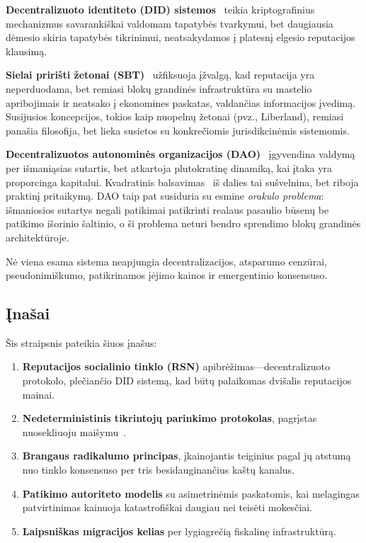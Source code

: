\documentclass[11pt,a4paper,twocolumn]{article}
\begin{document}
\textbf{Decentralizuoto identiteto (DID) sistemos}~\cite{did2022} teikia kriptografinius mechanizmus savarankiškai valdomam tapatybės tvarkymui, bet daugiausia dėmesio skiria tapatybės tikrinimui, neatsakydamos į platesnį elgesio reputacijos klausimą.

\textbf{Sielai pririšti žetonai (SBT)}~\cite{weyl2022} užfiksuoja įžvalgą, kad reputacija yra neperduodama, bet remiasi blokų grandinės infrastruktūra su mastelio apribojimais ir neatsako į ekonomines paskatas, valdančias informacijos įvedimą. Susijusios koncepcijos, tokios kaip nuopelnų žetonai (pvz., Liberland), remiasi panašia filosofija, bet lieka susietos su konkrečiomis jurisdikcinėmis sistemomis.

\textbf{Decentralizuotos autonominės organizacijos (DAO)}~\cite{buterin2014} įgyvendina valdymą per išmaniąsias sutartis, bet atkartoja plutokratinę dinamiką, kai įtaka yra proporcinga kapitalui. Kvadratinis balsavimas~\cite{buterin2019} iš dalies tai sušvelnina, bet riboja praktinį pritaikymą. DAO taip pat susiduria su esmine \emph{orakulo problema}: išmaniosios sutartys negali patikimai patikrinti realaus pasaulio būsenų be patikimo išorinio šaltinio, o ši problema neturi bendro sprendimo blokų grandinės architektūroje.

Nė viena esama sistema neapjungia decentralizacijos, atsparumo cenzūrai, pseudonimiškumo, patikrinamos įėjimo kainos ir emergentinio konsensuso.

\subsection{Įnašai}

Šis straipsnis pateikia šiuos įnašus:
\begin{enumerate}[nosep]
\item \textbf{Reputacijos socialinio tinklo (RSN)} apibrėžimas---decentralizuoto protokolo, plečiančio DID sistemą, kad būtų palaikomas dvišalis reputacijos mainai.
\item \textbf{Nedeterministinis tikrintojų parinkimo protokolas}, pagrįstas nuosekliuoju maišymu~\cite{karger1997}.
\item \textbf{Brangaus radikalumo principas}, įkainojantis teiginius pagal jų atstumą nuo tinklo konsensuso per tris besidauginančius kaštų kanalus.
\item \textbf{Patikimo autoriteto modelis} su asimetrinėmis paskatomis, kai melagingas patvirtinimas kainuoja katastrofiškai daugiau nei teisėti mokesčiai.
\item \textbf{Laipsniškas migracijos kelias} per lygiagrečią fiskalinę infrastruktūrą.
\end{enumerate}
\end{document}
